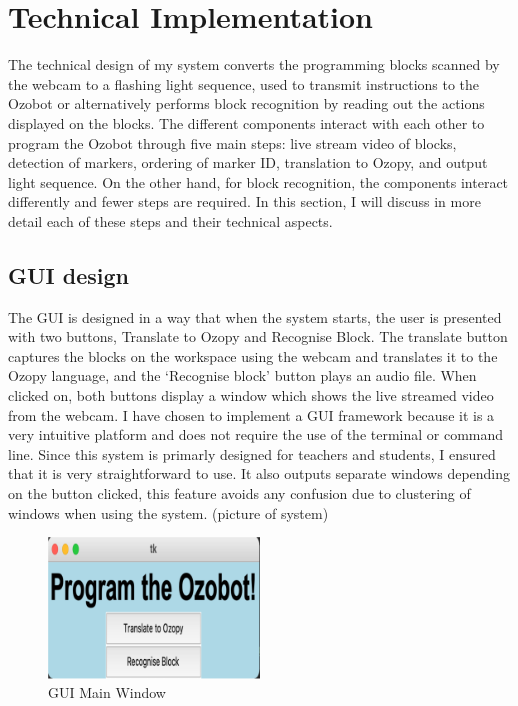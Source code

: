 \documentclass[oneside,%
                    author={Malak Hajji},
                    degree={BSc},
                    title={Designing An Accessible Computational Toolkit For Students},
                  subtitle={With Mixed Visual Abilities}]{dissertation}
\begin{document}
\section{Technical Implementation}
The technical design of my system converts the programming blocks scanned by the webcam to a flashing light sequence, used to transmit instructions to the Ozobot or alternatively performs block recognition by reading out the actions displayed on the blocks. The different components interact with each other to program the Ozobot through five main steps: live stream video of blocks, detection of markers, ordering of marker ID, translation to Ozopy, and output light sequence. On the other hand, for block recognition, the components interact differently and fewer steps are required. In this section, I will discuss in more detail each of these steps and their technical aspects. 
 
\subsection{GUI design} 
 
The GUI is designed in a way that when the system starts, the user is presented with two buttons, Translate to Ozopy and Recognise Block. The translate button captures the blocks on the workspace using the webcam and translates it to the Ozopy language, and the ‘Recognise block’ button plays an audio file. When clicked on, both buttons display a window which shows the live streamed video from the webcam.  
I have chosen to implement a GUI framework because it is a very intuitive platform and does not require the use of the terminal or command line. Since this system is primarly designed for teachers and students, I ensured that it is very straightforward to use. It also outputs separate windows depending on the button clicked, this feature avoids any confusion due to clustering of windows when using the system.  
(picture of system)
\FloatBarrier
\begin{figure}[h]
    \centering
    \includegraphics[width=0.5\textwidth]{thesis/gui.eps}
    \caption{GUI Main Window}
    \label{fig-gui}
\end{figure}
\FloatBarrier
\end{document}
